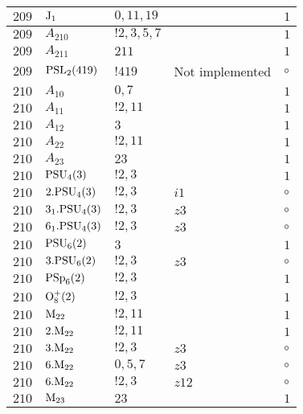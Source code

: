\documentclass[a4paper, 11pt]{article}
\begin{document}
\begin{longtable}{lllll}
        $ 209 $ & $ {\rm J}_1 $ & $ 0, 11, 19 $ & $ ~ $ & $ 1$ \\ \hline
        $ 209 $ & $ A_{210} $ & $ !2, 3, 5, 7 $ & $ ~ $ & $ 1$ \\ \hline
        $ 209 $ & $ A_{211} $ & $ 211 $ & $ ~ $ & $ 1$ \\ \hline
        $ 209 $ & $ {\rm PSL}_{2}(419) $ & $ !419 $ &  Not implemented &  $\circ$ \\ \hline
        $ 210 $ & $ A_{10} $ & $ 0,7 $ & $ ~ $ & $ 1$ \\ \hline
        $ 210 $ & $ A_{11} $ & $ ! 2,11 $ & $ ~ $ & $ 1$ \\ \hline
        $ 210 $ & $ A_{12} $ & $ 3 $ & $ ~ $ & $ 1$ \\ \hline
        $ 210 $ & $ A_{22} $ & $ ! 2,11 $ & $ ~ $ & $ 1$ \\ \hline
        $ 210 $ & $ A_{23} $ & $ 23 $ & $ ~ $ & $ 1$ \\ \hline
        $ 210 $ & $ {\rm PSU}_{4}(3) $ & $ ! 2,3 $ & $ ~ $ & $ 1$ \\ \hline
        $ 210 $ & $ 2.{\rm PSU}_{4}(3) $ & $ ! 2,3 $ & $ i1 $ &  $\circ$ \\ \hline
        $ 210 $ & $ 3_1.{\rm PSU}_{4}(3) $ & $ ! 2,3 $ & $ z3 $ &  $\circ$ \\ \hline
        $ 210 $ & $ 6_1.{\rm PSU}_{4}(3) $ & $ ! 2,3 $ & $ z3 $ &  $\circ$ \\ \hline
        $ 210 $ & $ {\rm PSU}_{6}(2) $ & $ 3 $ & $ ~ $ & $ 1$ \\ \hline
        $ 210 $ & $ 3.{\rm PSU}_{6}(2) $ & $ ! 2,3 $ & $ z3 $ &  $\circ$ \\ \hline
        $ 210 $ & $ {\rm PSp}_{6}(2) $ & $ ! 2,3 $ & $ ~ $ & $ 1$ \\ \hline
        $ 210 $ & $ {\rm O}_{8}^+(2) $ & $ ! 2,3 $ & $ ~ $ & $ 1$ \\ \hline
        $ 210 $ & $ {\rm M}_{22} $ & $ ! 2,11 $ & $ ~ $ & $ 1$ \\ \hline
        $ 210 $ & $ 2.{\rm M}_{22} $ & $ ! 2,11 $ & $ ~ $ & $ 1$ \\ \hline
        $ 210 $ & $ 3.{\rm M}_{22} $ & $ ! 2,3 $ & $ z3 $ &  $\circ$ \\ \hline
        $ 210 $ & $ 6.{\rm M}_{22} $ & $ 0,5,7 $ & $ z3 $ &  $\circ$ \\ \hline
        $ 210 $ & $ 6.{\rm M}_{22} $ & $ ! 2,3 $ & $ z12 $ &  $\circ$ \\ \hline
        $ 210 $ & $ {\rm M}_{23} $ & $ 23 $ & $ ~ $ & $ 1$ \\ \hline

\end{longtable}
\end{document}
